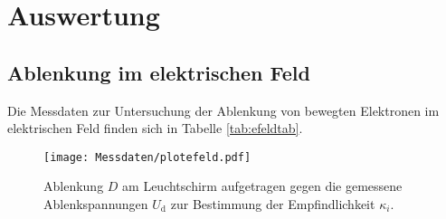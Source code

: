 \section{Auswertung}
\label{sec:Auswertung}

\subsection{Ablenkung im elektrischen Feld}
Die Messdaten zur Untersuchung der Ablenkung von bewegten Elektronen im elektrischen Feld finden sich in Tabelle \ref{tab:efeldtab}.
\begin{figure}
  \centering
  \texttt{[image: Messdaten/plotefeld.pdf]}
  \caption{Ablenkung $D$ am Leuchtschirm aufgetragen gegen die gemessene Ablenkspannungen $U_\mathrm{d}$ zur Bestimmung der Empfindlichkeit $\kappa_i$.}
  \label{fig:efeld}
\end{figure}

